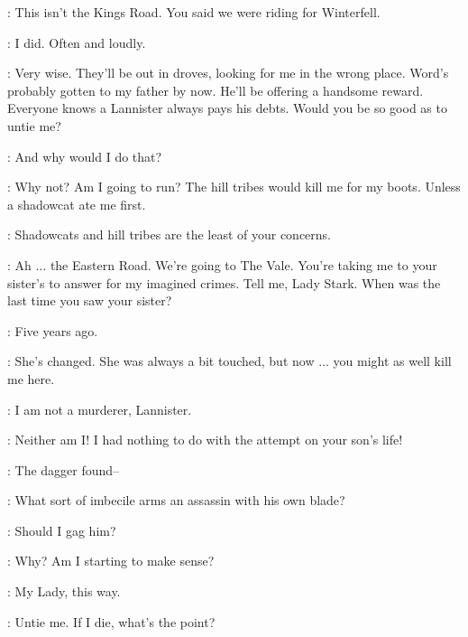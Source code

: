 \TYRION: This isn't the Kings Road. You said we were riding for Winterfell. 

\CATELYN: I did.  Often and loudly. 

\TYRION: Very wise. They'll be out in droves, looking for me in the wrong place. Word's probably gotten to my father by now. He'll be offering a handsome reward. Everyone knows a Lannister always pays his debts. Would you be so good as to untie me? 

\CATELYN: And why would I do that? 

\TYRION: Why not? Am I going to run? The hill tribes would kill me for my boots. Unless a shadowcat ate me first. 

\CATELYN: Shadowcats and hill tribes are the least of your concerns. 

\TYRION: Ah $\ldots$ the Eastern Road. We're going to The Vale. You're taking me to your sister's to answer for my imagined crimes. Tell me, Lady Stark. When was the last time you saw your sister? 

\CATELYN: Five years ago. 

\TYRION: She's changed. She was always a bit touched, but now $\ldots$ you might as well kill me here. 

\CATELYN: I am not a murderer, Lannister. 

\TYRION: Neither am I! I had nothing to do with the attempt on your son's life! 

\CATELYN: The dagger found--

\TYRION: What sort of imbecile arms an assassin with his own blade? 

\RODRIK: Should I gag him? 

\TYRION: Why? Am I starting to make sense? 


\RODRIK: My Lady, this way. 


\TYRION: Untie me. If I die, what's the point? 


